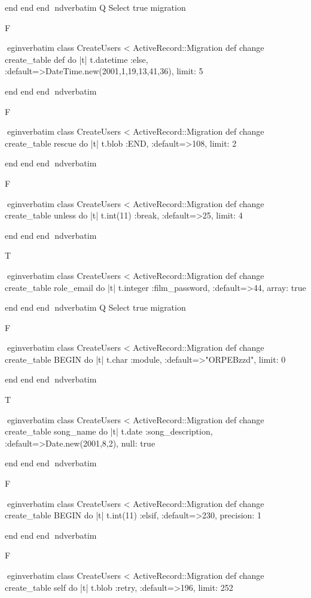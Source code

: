     end 
  end 
end
nd{verbatim}
Q
 Select true migration

F

egin{verbatim}
 class CreateUsers < ActiveRecord::Migration 
  def change 
    create_table def do |t| 
      t.datetime :else, :default=>DateTime.new(2001,1,19,13,41,36), limit: 5
    
    end 
  end 
end
nd{verbatim}

F

egin{verbatim}
 class CreateUsers < ActiveRecord::Migration 
  def change 
    create_table rescue do |t| 
      t.blob :END, :default=>108, limit: 2
    
    end 
  end 
end
nd{verbatim}

F

egin{verbatim}
 class CreateUsers < ActiveRecord::Migration 
  def change 
    create_table unless do |t| 
      t.int(11) :break, :default=>25, limit: 4
    
    end 
  end 
end
nd{verbatim}

T

egin{verbatim}
 class CreateUsers < ActiveRecord::Migration 
  def change 
    create_table role_email do |t| 
      t.integer :film_password, :default=>44, array: true
    
    end 
  end 
end
nd{verbatim}
Q
 Select true migration

F

egin{verbatim}
 class CreateUsers < ActiveRecord::Migration 
  def change 
    create_table BEGIN do |t| 
      t.char :module, :default=>"ORPEBzzd", limit: 0
    
    end 
  end 
end
nd{verbatim}

T

egin{verbatim}
 class CreateUsers < ActiveRecord::Migration 
  def change 
    create_table song_name do |t| 
      t.date :song_description, :default=>Date.new(2001,8,2), null: true
    
    end 
  end 
end
nd{verbatim}

F

egin{verbatim}
 class CreateUsers < ActiveRecord::Migration 
  def change 
    create_table BEGIN do |t| 
      t.int(11) :elsif, :default=>230, precision: 1
    
    end 
  end 
end
nd{verbatim}

F

egin{verbatim}
 class CreateUsers < ActiveRecord::Migration 
  def change 
    create_table self do |t| 
      t.blob :retry, :default=>196, limit: 252
    
